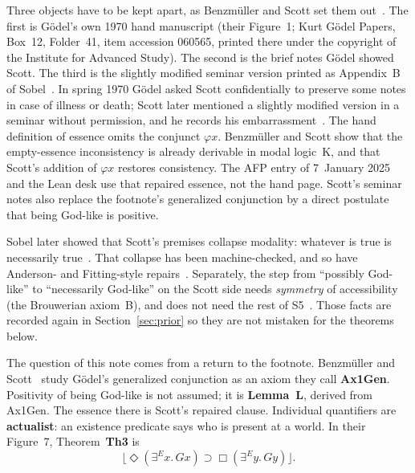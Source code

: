 \documentclass[11pt]{article}
\newcommand{\floor}[1]{\lfloor #1 \rfloor}
\begin{document}
Three objects have to be kept apart, as Benzm\"uller and Scott set them
out~\cite{BenzScott2025}. The first is G\"odel's own 1970 hand manuscript (their Figure~1;
Kurt G\"odel Papers, Box~12, Folder~41, item accession 060565, printed there under the
copyright of the Institute for Advanced Study). The second is the brief notes G\"odel showed
Scott. The third is the slightly modified seminar version printed as Appendix~B of
Sobel~\cite{Scott2004,Sobel2004}. In spring 1970 G\"odel asked Scott confidentially to
preserve some notes in case of illness or death; Scott later mentioned a slightly modified
version in a seminar without permission, and he records his embarrassment~\cite{BenzScott2025}.
The hand definition of essence omits the conjunct \(\varphi x\). Benzm\"uller and Scott show
that the empty-essence inconsistency is already derivable in modal logic~K, and that Scott's
addition of \(\varphi x\) restores consistency. The AFP entry of 7~January 2025 and the Lean
desk use that repaired essence, not the hand page. Scott's seminar notes also replace the
footnote's generalized conjunction by a direct postulate that being God-like is positive.

Sobel later showed that Scott's premises collapse modality: whatever is true is necessarily
true~\cite{Sobel1987,Sobel2004}. That collapse has been machine-checked, and so have
Anderson- and Fitting-style repairs~\cite{Anderson1990,Fitting2002,BenzFu2020}. Separately,
the step from ``possibly God-like'' to ``necessarily God-like'' on the Scott side needs
\emph{symmetry} of accessibility (the Brouwerian axiom~B), and does not need the rest of
S5~\cite{Kanckos2017}. Those facts are recorded again in Section~\ref{sec:prior} so they
are not mistaken for the theorems below.

The question of this note comes from a return to the footnote. Benzm\"uller and
Scott~\cite{BenzScottAFP2025,BenzScott2025} study G\"odel's generalized conjunction as an
axiom they call \textbf{Ax1Gen}. Positivity of being God-like is not assumed; it is
\textbf{Lemma~L}, derived from Ax1Gen. The essence there is Scott's repaired clause. Individual
quantifiers are \textbf{actualist}: an existence predicate says who is present at a world.
In their Figure~7, Theorem~\textbf{Th3} is
\[
\floor{\Diamond(\exists^E x.\, Gx) \supset \Box(\exists^E y.\, Gy)}.
\]
\end{document}
